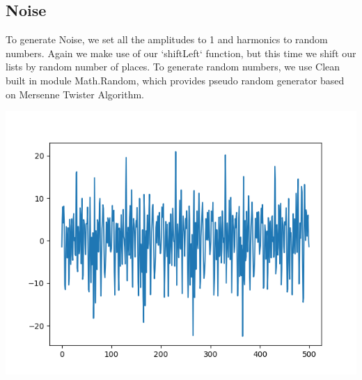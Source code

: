 \documentclass{article}
\begin{document}
\subsection{Noise}
To generate Noise, we set all the amplitudes to 1 and harmonics to random numbers. Again we make use of our `shiftLeft` function, but this time we shift our lists by random number of places.
To generate random numbers, we use Clean built in module Math.Random, which provides pseudo random generator based on Mersenne Twister Algorithm.

\begin{center}
    \includegraphics{noise.png}
\end{center}
\end{document}
